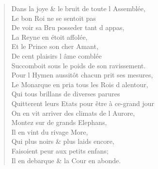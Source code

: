 \documentclass[14pt,a4paper]{memoir}
\begin{document}
{{\begin{otherlanguage}{french}
\begin{verse}
Dans la joye \& le bruit de toute l\textquotesingle{} Assemblée, \\
\vin Le bon Roi ne se sentoit pas \\
\vin De voir sa Bru posseder tant d\textquotesingle{} appas, \\
\vin La Reyne en étoit affolée, \\
\vin Et le Prince son cher Amant, \\
\vin De cent plaisirs l\textquotesingle{} âme comblée \\
Succomboit sous le poids de son ravissement. \\
Pour l\textquotesingle{} Hymen aussitôt chacun prit ses mesures, \\
Le Monarque en pria tous les Rois d\textquotesingle{} alentour, \\
\vin Qui tous brillans de diverses parures \\
Quitterent leurs Etats pour être à ce-grand jour \\
On en vit arriver des climats de l\textquotesingle{} Aurore, \\
\vin Montez sur de grands Elephans, \\
\vin Il en vint du rivage More, \\
\vin Qui plus noirs \& plus laids encore, \\
\vin Faisoient peur aux petits enfans; \\
\vin Il en debarque \& la Cour en abonde.


\end{verse}
\end{otherlanguage}}}
\end{document}

